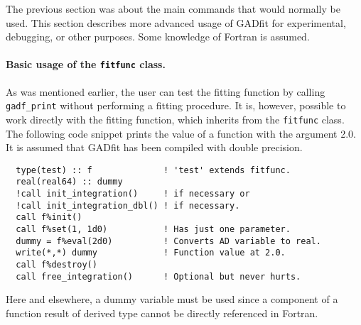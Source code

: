 \documentclass{article}
\begin{document}
The previous section was about the main commands that would normally be used. This section describes more advanced usage of GADfit for experimental, debugging, or other purposes. Some knowledge of Fortran is assumed.

\paragraph{Basic usage of the \texttt{fitfunc} class.} As was mentioned earlier, the user can test the fitting function by calling \verb+gadf_print+ without performing a fitting procedure. It is, however, possible to work directly with the fitting function, which inherits from the \verb+fitfunc+ class. The following code snippet prints the value of a function with the argument 2.0. It is assumed that GADfit has been compiled with double precision.
\begin{verbatim}
  type(test) :: f              ! 'test' extends fitfunc.
  real(real64) :: dummy
  !call init_integration()     ! if necessary or
  !call init_integration_dbl() ! if necessary.
  call f%init()
  call f%set(1, 1d0)           ! Has just one parameter.
  dummy = f%eval(2d0)          ! Converts AD variable to real.
  write(*,*) dummy             ! Function value at 2.0.
  call f%destroy()
  call free_integration()      ! Optional but never hurts.
\end{verbatim}
Here and elsewhere, a dummy variable must be used since a component of a function result of derived type cannot be directly referenced in Fortran.
\end{document}
